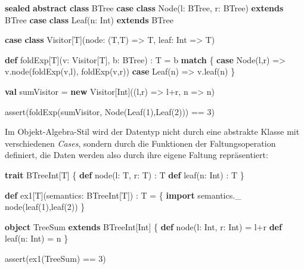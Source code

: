 \documentclass[]{article}
\newenvironment{Shaded}{}{}
\newcommand{\DecValTok}[1]{\textcolor[rgb]{0.25,0.63,0.44}{#1}}
\newcommand{\FunctionTok}[1]{\textcolor[rgb]{0.02,0.16,0.49}{#1}}
\newcommand{\KeywordTok}[1]{\textcolor[rgb]{0.00,0.44,0.13}{\textbf{#1}}}
\newcommand{\NormalTok}[1]{#1}
\begin{document}
\begin{Shaded}
\begin{Highlighting}[]
\KeywordTok{sealed} \KeywordTok{abstract} \KeywordTok{class}\NormalTok{ BTree}
\KeywordTok{case} \KeywordTok{class}\NormalTok{ Node(l: BTree, r: BTree) }\KeywordTok{extends}\NormalTok{ BTree}
\KeywordTok{case} \KeywordTok{class} \FunctionTok{Leaf}\NormalTok{(n: Int) }\KeywordTok{extends}\NormalTok{ BTree}

\KeywordTok{case} \KeywordTok{class}\NormalTok{ Visitor[T](node: (T,T) =\textgreater{} T, leaf: Int =\textgreater{} T)}

\KeywordTok{def}\NormalTok{ foldExp[T](v: Visitor[T], b: BTree) : T = b }\KeywordTok{match}\NormalTok{ \{}
  \KeywordTok{case}\NormalTok{ Node(l,r) =\textgreater{} v.}\FunctionTok{node}\NormalTok{(}\FunctionTok{foldExp}\NormalTok{(v,l), }\FunctionTok{foldExp}\NormalTok{(v,r))}
  \KeywordTok{case} \FunctionTok{Leaf}\NormalTok{(n)   =\textgreater{} v.}\FunctionTok{leaf}\NormalTok{(n)}
\NormalTok{\}}

\KeywordTok{val}\NormalTok{ sumVisitor = }\KeywordTok{new}\NormalTok{ Visitor[Int]((l,r) =\textgreater{} l+r, n =\textgreater{} n)}

\FunctionTok{assert}\NormalTok{(}\FunctionTok{foldExp}\NormalTok{(sumVisitor, Node(}\FunctionTok{Leaf}\NormalTok{(}\DecValTok{1}\NormalTok{),}\FunctionTok{Leaf}\NormalTok{(}\DecValTok{2}\NormalTok{))) == }\DecValTok{3}\NormalTok{)}
\end{Highlighting}
\end{Shaded}

Im Objekt-Algebra-Stil wird der Datentyp nicht durch eine abstrakte
Klasse mit verschiedenen \emph{Cases}, sondern durch die Funktionen der
Faltungsoperation definiert, die Daten werden also durch ihre eigene
Faltung repräsentiert:

\begin{Shaded}
\begin{Highlighting}[]
\KeywordTok{trait}\NormalTok{ BTreeInt[T] \{}
  \KeywordTok{def} \FunctionTok{node}\NormalTok{(l: T, r: T) : T}
  \KeywordTok{def} \FunctionTok{leaf}\NormalTok{(n: Int) : T}
\NormalTok{\}}

\KeywordTok{def}\NormalTok{ ex1[T](semantics: BTreeInt[T]) : T = \{}
  \KeywordTok{import}\NormalTok{ semantics.}\FunctionTok{\_}
  \FunctionTok{node}\NormalTok{(}\FunctionTok{leaf}\NormalTok{(}\DecValTok{1}\NormalTok{),}\FunctionTok{leaf}\NormalTok{(}\DecValTok{2}\NormalTok{))}
\NormalTok{\}}

\KeywordTok{object}\NormalTok{ TreeSum }\KeywordTok{extends}\NormalTok{ BTreeInt[Int] \{}
  \KeywordTok{def} \FunctionTok{node}\NormalTok{(l: Int, r: Int) = l+r}
  \KeywordTok{def} \FunctionTok{leaf}\NormalTok{(n: Int) = n}
\NormalTok{\}}

\FunctionTok{assert}\NormalTok{(}\FunctionTok{ex1}\NormalTok{(TreeSum) == }\DecValTok{3}\NormalTok{)}
\end{Highlighting}
\end{Shaded}
\end{document}
